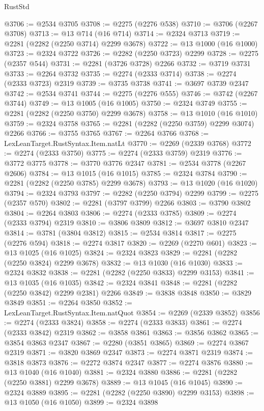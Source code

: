 \begin{lexlean}{RustStd}
\begin{coremodule}
{\begin{coremodule}
{{{{{{{{{{{{{{@3706 := @2534 @3705
@3708 := @2275 (@2276 @538)
@3710 := @3706 (@2267 @3708)
@3713 := @13 @714 (@16 @714)
@3714 := @2324 @3713
@3719 := @2281 (@2282 (@2250 @3714) @2299 @3678)
@3722 := @13 @1000 (@16 @1000)
@3723 := @2324 @3722
@3726 := @2282 (@2250 @3723) @2299
@3728 := @2275 (@2357 @544)
@3731 := @2281 (@3726 @3728) @2266
@3732 := @3719 @3731
@3733 := @2264 @3732
@3735 := @2274 (@2333 @3714)
@3738 := @2274 (@2333 @3723) @2319
@3739 := @3735 @3738
@3741 := @3697 @3739 @2347
@3742 := @2534 @3741
@3744 := @2275 (@2276 @555)
@3746 := @3742 (@2267 @3744)
@3749 := @13 @1005 (@16 @1005)
@3750 := @2324 @3749
@3755 := @2281 (@2282 (@2250 @3750) @2299 @3678)
@3758 := @13 @1010 (@16 @1010)
@3759 := @2324 @3758
@3765 := @2281 (@2282 (@2250 @3759) @2299 @3074) @2266
@3766 := @3755 @3765
@3767 := @2264 @3766
@3768 := LexLeanTarget.RustSyntax.Item.natLt
@3770 := @2269 (@2339 @3768)
@3772 := @2274 (@2333 @3750)
@3775 := @2274 (@2333 @3759) @2319
@3776 := @3772 @3775
@3778 := @3770 @3776 @2347
@3781 := @2534 @3778 (@2267 @2606)
@3784 := @13 @1015 (@16 @1015)
@3785 := @2324 @3784
@3790 := @2281 (@2282 (@2250 @3785) @2299 @3678)
@3793 := @13 @1020 (@16 @1020)
@3794 := @2324 @3793
@3797 := @2282 (@2250 @3794) @2299
@3799 := @2275 (@2357 @570)
@3802 := @2281 (@3797 @3799) @2266
@3803 := @3790 @3802
@3804 := @2264 @3803
@3806 := @2274 (@2333 @3785)
@3809 := @2274 (@2333 @3794) @2319
@3810 := @3806 @3809
@3812 := @3697 @3810 @2347
@3814 := @3781 (@3804 @3812)
@3815 := @2534 @3814
@3817 := @2275 (@2276 @594)
@3818 := @2274 @3817
@3820 := @2269 (@2270 @601)
@3823 := @13 @1025 (@16 @1025)
@3824 := @2324 @3823
@3829 := @2281 (@2282 (@2250 @3824) @2299 @3678)
@3832 := @13 @1030 (@16 @1030)
@3833 := @2324 @3832
@3838 := @2281 (@2282 (@2250 @3833) @2299 @3153)
@3841 := @13 @1035 (@16 @1035)
@3842 := @2324 @3841
@3848 := @2281 (@2282 (@2250 @3842) @2299 @2381) @2266
@3849 := @3838 @3848
@3850 := @3829 @3849
@3851 := @2264 @3850
@3852 := LexLeanTarget.RustSyntax.Item.natQuot
@3854 := @2269 (@2339 @3852)
@3856 := @2274 (@2333 @3824)
@3858 := @2274 (@2333 @3833)
@3861 := @2274 (@2333 @3842) @2319
@3862 := @3858 @3861
@3863 := @3856 @3862
@3865 := @3854 @3863 @2347
@3867 := @2280 (@3851 @3865)
@3869 := @2274 @3867 @2319
@3871 := @3820 @3869 @2347
@3873 := @2274 @3871 @2319
@3874 := @3818 @3873
@3876 := @2272 @3874 @2347
@3877 := @2274 @3876
@3880 := @13 @1040 (@16 @1040)
@3881 := @2324 @3880
@3886 := @2281 (@2282 (@2250 @3881) @2299 @3678)
@3889 := @13 @1045 (@16 @1045)
@3890 := @2324 @3889
@3895 := @2281 (@2282 (@2250 @3890) @2299 @3153)
@3898 := @13 @1050 (@16 @1050)
@3899 := @2324 @3898
}}}}}}}}}}}}}}
\end{coremodule}}
\end{coremodule}
\end{lexlean}
